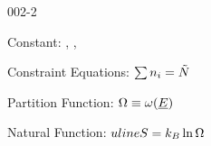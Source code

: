 \begin{mitframe}{002-2} %

    
\begin{listone}
    
    \item Constant: \nummoles, \uline{\vol}, \uline{\energy}
    
    \item Constraint Equations: $\sum\nolimits \molspecies{i} = \totmoles$ 
    
           
    \item Partition Function: $\mpc \equiv \mpf(\uline{\energy})$
    
    
           
    \item Natural Function: $uline{\entropy} = \boltz\ln\mpc$
    
    
    
\end{listone}			

\end{mitframe}
